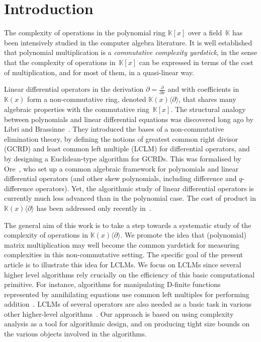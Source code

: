 \documentclass{sig-alt-full}
\def\K {\ensuremath{\mathbb{K}}}
\newcommand{\x}{x}
\newcommand{\Dx}{\partial}
\begin{document}
\section{Introduction} 
The complexity of operations in the polynomial ring $\K[\x]$ over a
field~$\K$ has been intensively studied in the computer algebra literature.
It is well established that polynomial multiplication is a \emph{commutative
complexity yardstick}, in the sense that the complexity of operations
in~$\K[\x]$ can be expressed in terms of the cost of multiplication, and for
most of them, in a quasi-linear way.

Linear differential operators in the derivation $\Dx =
\frac{\partial}{\partial x}$ and with coefficients in~$\K(x)$ form a
non-commutative ring, denoted $\K(\x)\langle \Dx\rangle$, that shares many
algebraic properties with the commutative ring~$\K[\x]$. The structural
analogy between polynomials and linear differential equations was discovered
long ago by Libri and Brassinne~\cite{Libri1833, Brassinne1864, Demidov83}.
They introduced the bases of a non-commutative elimination theory, by defining
the notions of greatest common right divisor (GCRD) and least common left
multiple (LCLM) for differential operators, and by designing a Euclidean-type
algorithm for GCRDs.
This was  formalised by Ore~\cite{Ore32,Ore33}, who set up a common
algebraic framework for polynomials and linear differential operators (and
other skew polynomials, including difference and $q$-difference operators).
Yet, the algorithmic study of linear differential operators is currently much
less advanced than in the polynomial case. The cost of product in
$\K(\x)\langle \Dx\rangle$ has been addressed only recently
in~\cite{VdHoeven02,BoChLe08}. 

The general aim of this work is to take a step towards a systematic study of
the complexity of operations in $\K(\x)\langle \Dx\rangle$. We promote the
idea that (polynomial) matrix multiplication may well become the common
yardstick for measuring complexities in this non-commutative setting. The
specific goal of the present article is to illustrate this idea
for LCLMs. We focus on LCLMs since several higher level
algorithms rely crucially on the efficiency of this basic computational
primitive. For instance, algorithms for manipulating D-finite functions
represented by annihilating equations use common left multiples for performing
addition~\cite{Stanley80,SaZi94}. 
LCLMs of several operators are also needed as a basic task in various other higher-level algorithms~\cite{BaChLo03,Le03,ClHo04}. 
Our approach is based on using complexity analysis as a tool for algorithmic
design, and on producing tight size bounds on the various objects involved in
the algorithms.
\end{document}
